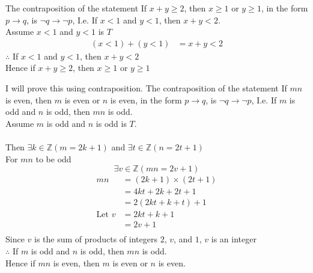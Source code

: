 \documentclass[12pt letter]{report}
\begin{document}

\begin{myproof}
	The contraposition of the statement If $x + y \geq 2$, then $x \geq 1$ or $y \geq 1$, in the form $p \to q$, is
	$\neg q \to \neg p$, I.e. If $x < 1$ and $y < 1$, then $x + y < 2$.\\
	Assume $x < 1$ and $y < 1$ is $T$ \\
	\begin{align*}
		\left( x < 1 \right) + \left( y < 1 \right) & = x + y < 2
	\end{align*}
	$\therefore$ If $x < 1$ and $y < 1$, then $x + y < 2$\\
	Hence if $x + y \geq 2$, then $x \geq 1$ or $y \geq 1$
\end{myproof}


\begin{myproof}
	I will prove this using contraposition. The contraposition of the statement If $mn$ is even, then $m$ is even or $n$
	is even, in the form $p \to q$, is $\neg q \to \neg p$, I.e. If $m$ is odd and $n$ is odd, then $mn$ is odd. \\
	Assume $m$ is odd and $n$ is odd is $T$.\\
	\\
	Then $\exists k \in \mathbb{Z} \left( m = 2k + 1 \right) $ and $\exists t \in \mathbb{Z} \left( n = 2t + 1 \right) $\\
	For $mn$ to be odd\\
	\[
		\exists v \in \mathbb{Z} \left( mn = 2v +1 \right)
	\]
	\begin{align*}
		mn            & = \left( 2k + 1 \right) \times  \left( 2t + 1  \right) \\
		              & = 4kt + 2k + 2t + 1                                    \\
		              & = 2 \left( 2kt + k + t \right) +1                      \\
		\text{Let } v & = 2kt + k + 1                                          \\
		              & = 2v + 1                                               \\
	\end{align*}
	Since $v$ is the sum of products of integers $2$, $v$, and $1$, $v$ is an integer\\
	$\therefore$ If $m$ is odd and $n$ is odd, then $mn$ is odd.\\
	Hence if $mn$ is even, then $m$ is even or $n$ is even.

\end{myproof}
\end{document}
